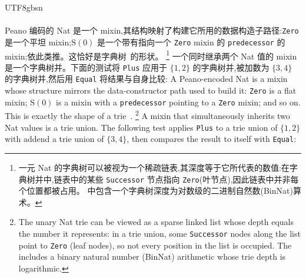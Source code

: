 \begin{CJK*}{UTF8}{gbsn}
\paragraph{}
\label{sec:case-study-cartesian}
\ifPaperChinese
Peano 编码的 Nat 是一个 mixin,其结构映射了构建它所用的数据构造子路径:\texttt{Zero} 是一个平坦 mixin;$\mathrm{S}(0)$ 是一个带有指向一个 \texttt{Zero} mixin 的 \texttt{predecessor} 的 mixin;依此类推。这恰好是字典树~\cite{fredkin1960-trie-memory}的形状。%
\footnote{
  一元 Nat 的字典树可以被视为一个稀疏链表,其深度等于它所代表的数值:在字典树并中,链表中的某些 \texttt{Successor} 节点指向 \texttt{Zero}(叶节点),因此链表中并非每个位置都被占用。 中包含一个字典树深度为对数级的二进制自然数(BinNat)算术。
}
一个同时继承两个 Nat 值的 mixin 是一个字典树并。下面的测试将 \texttt{Plus} 应用于 $\{1,2\}$ 的字典树并,被加数为 $\{3,4\}$ 的字典树并,然后用 \texttt{Equal} 将结果与自身比较:
\else
A Peano-encoded Nat is a mixin whose structure mirrors the
data-constructor path used to build it: \texttt{Zero} is a flat mixin;
$\mathrm{S}(0)$ is a mixin with a \texttt{predecessor}
pointing to a \texttt{Zero} mixin; and so on.
This is exactly the shape of a trie~\cite{fredkin1960-trie-memory}.%
\footnote{
  The unary Nat trie can be viewed as a sparse linked list
  whose depth equals the number it represents:
  in a trie union, some \texttt{Successor} nodes along
  the list point to \texttt{Zero} (leaf nodes),
  so not every position in the list is occupied.
  The includes a binary natural number
  (BinNat) arithmetic whose trie depth is logarithmic.
}
A mixin that simultaneously inherits two Nat values is a trie union.
The following test applies \texttt{Plus} to a trie union of $\{1,2\}$
with addend a trie union of $\{3,4\}$, then compares the result to itself
with \texttt{Equal}:
\fi
{}

\end{CJK*}
